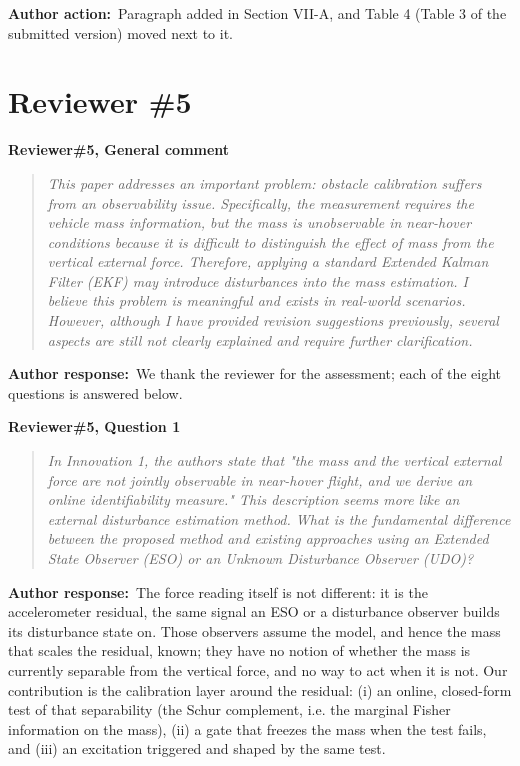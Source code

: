 \documentclass[11pt]{article}
\newcommand{\concern}[1]{\par\medskip\noindent\colorbox{gray!12}{\parbox{\dimexpr\linewidth-2\fboxsep}{\textbf{#1}}}\par\smallskip}
\newcommand{\rlabel}[1]{\par\textbf{#1}\ }
\begin{document}
\rlabel{Author action:}Paragraph added in Section VII-A, and Table 4 (Table 3 of the submitted version) moved next to it.

\section*{Reviewer \#5}

\concern{Reviewer\#5, General comment}

\begin{quote}\itshape This paper addresses an important problem: obstacle calibration suffers from an observability issue. Specifically, the measurement requires the vehicle mass information, but the mass is unobservable in near-hover conditions because it is difficult to distinguish the effect of mass from the vertical external force. Therefore, applying a standard Extended Kalman Filter (EKF) may introduce disturbances into the mass estimation. I believe this problem is meaningful and exists in real-world scenarios. However, although I have provided revision suggestions previously, several aspects are still not clearly explained and require further clarification.\end{quote}

\rlabel{Author response:}We thank the reviewer for the assessment; each of the eight questions is answered below.

\concern{Reviewer\#5, Question 1}

\begin{quote}\itshape In Innovation 1, the authors state that "the mass and the vertical external force are not jointly observable in near-hover flight, and we derive an online identifiability measure." This description seems more like an external disturbance estimation method. What is the fundamental difference between the proposed method and existing approaches using an Extended State Observer (ESO) or an Unknown Disturbance Observer (UDO)?\end{quote}

\rlabel{Author response:}The force reading itself is not different: it is the accelerometer residual, the same signal an ESO or a disturbance observer builds its disturbance state on. Those observers assume the model, and hence the mass that scales the residual, known; they have no notion of whether the mass is currently separable from the vertical force, and no way to act when it is not. Our contribution is the calibration layer around the residual: (i) an online, closed-form test of that separability (the Schur complement, i.e. the marginal Fisher information on the mass), (ii) a gate that freezes the mass when the test fails, and (iii) an excitation triggered and shaped by the same test.
\end{document}

